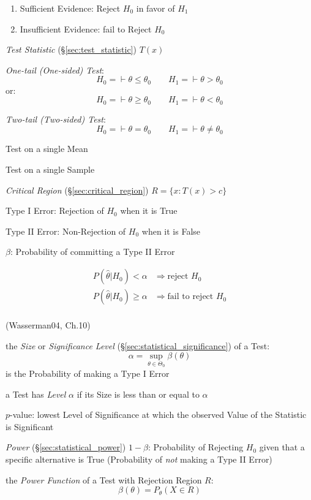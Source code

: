 \begin{enumerate}
  \item Sufficient Evidence: Reject $H_0$ in favor of $H_1$
  \item Insufficient Evidence: fail to Reject $H_0$
\end{enumerate}

\emph{Test Statistic} (\S\ref{sec:test_statistic}) $T(x)$

\emph{One-tail (One-sided) Test}:
\[
  H_0 = \vdash \theta \leq \theta_0 \quad\quad H_1 = \vdash \theta > \theta_0
\]
or:
\[
  H_0 = \vdash \theta \geq \theta_0 \quad\quad H_1 = \vdash \theta < \theta_0
\]

\emph{Two-tail (Two-sided) Test}:
\[
  H_0 = \vdash \theta = \theta_0 \quad\quad H_1 = \vdash \theta \neq \theta_0
\]

Test on a single Mean

Test on a single Sample

\emph{Critical Region} (\S\ref{sec:critical_region}) $R = \{ x : T(x) > c \}$

Type I Error: Rejection of $H_0$ when it is True

Type II Error: Non-Rejection of $H_0$ when it is False

$\beta$: Probability of committing a Type II Error

\begin{align*}
  P(\hat{\theta} | H_0) < \alpha & \Rightarrow \text{reject } H_0 \\
  P(\hat{\theta} | H_0) \geq \alpha & \Rightarrow \text{fail to reject } H_0 \\
\end{align*}

(Wasserman04, Ch.10)

the \emph{Size} or \emph{Significance Level}
(\S\ref{sec:statistical_significance}) of a Test:
\[
  \alpha = \sup_{\theta \in \Theta_0} \beta(\theta)
\]
is the Probability of making a Type I Error

a Test has \emph{Level} $\alpha$ if its Size is less than or equal to $\alpha$

$p$-value: lowest Level of Significance at which the observed Value of
the Statistic is Significant

\emph{Power} (\S\ref{sec:statistical_power}) $1 - \beta$: Probability of
Rejecting $H_0$ given that a specific alternative is True (Probability of
\emph{not} making a Type II Error)

the \emph{Power Function} of a Test with Rejection Region $R$:
\[
  \beta(\theta) = P_\theta(X \in R)
\]

